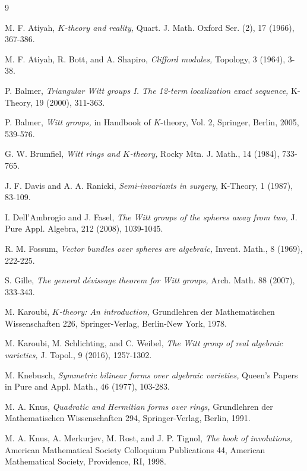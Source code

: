 \documentclass[psamsfonts]{amsart}
\theoremstyle{plain}
\theoremstyle{theorem}
\theoremstyle{definition}
\begin{document}
	
	\begin{thebibliography}{9}

M. F. Atiyah,
{\it $K$-theory and reality,\/}
Quart. J. Math. Oxford Ser. (2), 17 (1966), 367-386.

M. F. Atiyah, R. Bott, and A. Shapiro,
{\it Clifford modules,\/}
Topology, 3 (1964), 3-38.

P. Balmer, 
{\it Triangular Witt groups I. The 12-term localization exact sequence,\/}
K-Theory, 19 (2000), 311-363.

P. Balmer, 
{\it Witt groups,\/}
in Handbook of $K$-theory, Vol. 2, Springer, Berlin, 2005, 539-576.

G. W. Brumfiel, 
{\it Witt rings and $K$-theory,\/}
Rocky Mtn. J. Math., 14 (1984), 733-765.

J. F. Davis and A. A. Ranicki, 
{\it Semi-invariants in surgery,\/}
K-Theory, 1 (1987), 83-109.

I. Dell'Ambrogio and J. Fasel, 
{\it The Witt groups of the spheres away from two,\/}
J. Pure Appl. Algebra, 212 (2008), 1039-1045.


R. M. Fossum,
{\it Vector bundles over spheres are algebraic,\/}
Invent. Math., 8 (1969), 222-225.

S. Gille,
{\it The general d\'{e}vissage theorem for Witt groups,\/}
Arch. Math. 88 (2007), 333-343.

M. Karoubi, 
{\it $K$-theory: An introduction,\/}
Grundlehren der Mathematischen Wissenschaften 226, Springer-Verlag, Berlin-New York, 1978.

M. Karoubi, M. Schlichting, and C. Weibel,
{\it The Witt group of real algebraic varieties,\/}
J. Topol., 9 (2016), 1257-1302.

M. Knebusch,
{\it Symmetric bilinear forms over algebraic varieties,\/}
Queen's Papers in Pure and Appl. Math., 46 (1977), 103-283.

M. A. Knus, 
{\it Quadratic and Hermitian forms over rings,\/}
Grundlehren der Mathematischen Wissenschaften 294, Springer-Verlag, Berlin, 1991.

M. A. Knus, A. Merkurjev, M. Rost, and J. P. Tignol, 
{\it The book of involutions,\/}
American Mathematical Society Colloquium Publications 44, American Mathematical Society, Providence, RI, 1998.




\end{thebibliography}
\end{document}
